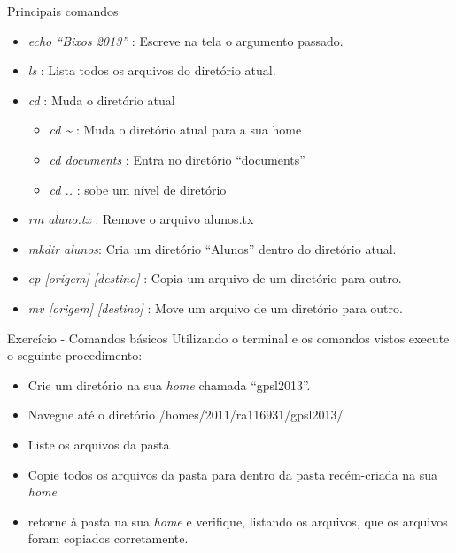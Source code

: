\documentclass{beamer}
\begin{document}
\begin{frame}{Principais comandos}
   \begin{itemize}
   \item \emph{echo ``Bixos 2013''} : Escreve na tela o argumento passado.
   \item \emph{ls} : Lista todos os arquivos do diretório atual.
   \item \emph{cd} : Muda o diretório atual
     \begin{itemize}
     \item \emph{cd \~{}} : Muda o diretório atual para a sua home
     \item \emph{cd documents} : Entra no diretório ``documents''
     \item \emph{cd ..} : sobe um nível de diretório
     \end{itemize}
   \item \emph{rm aluno.tx} : Remove o arquivo alunos.tx
   \item \emph{mkdir alunos}: Cria um diretório ``Alunos'' dentro do
     diretório atual.
   \item \emph{cp [origem] [destino]} : Copia um arquivo de um diretório para
     outro.
   \item \emph{mv [origem] [destino]} : Move um arquivo de um diretório para
     outro.
       

   \end{itemize}
\end{frame}

\begin{frame}{Exercício - Comandos básicos}
  Utilizando o terminal e os comandos vistos execute o seguinte procedimento:
  \begin{itemize}
  \item Crie um diretório na sua \emph{home} chamada ``gpsl2013''.
  \item Navegue até o diretório /homes/2011/ra116931/gpsl2013/
  \item Liste os arquivos da pasta
  \item Copie todos os arquivos da pasta para dentro da pasta recém-criada na
    sua \emph{home}
  \item retorne à pasta na sua \emph{home} e verifique, listando os arquivos,
    que os arquivos foram copiados corretamente.
  \end{itemize}
\end{frame}
\end{document}
